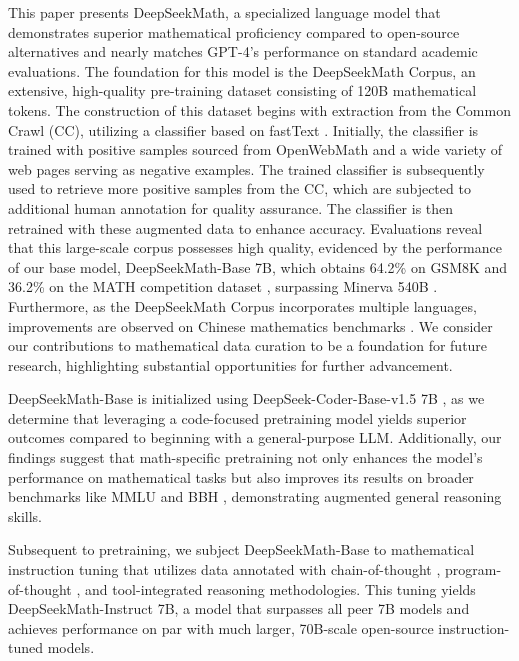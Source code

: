 This paper presents DeepSeekMath, a specialized language model that demonstrates superior mathematical proficiency compared to open-source alternatives and nearly matches GPT-4’s performance on standard academic evaluations. The foundation for this model is the DeepSeekMath Corpus, an extensive, high-quality pre-training dataset consisting of 120B mathematical tokens. The construction of this dataset begins with extraction from the Common Crawl (CC), utilizing a classifier based on fastText \citep{joulin2016fasttext}. Initially, the classifier is trained with positive samples sourced from OpenWebMath \citep{openwebmath} and a wide variety of web pages serving as negative examples. The trained classifier is subsequently used to retrieve more positive samples from the CC, which are subjected to additional human annotation for quality assurance. The classifier is then retrained with these augmented data to enhance accuracy. Evaluations reveal that this large-scale corpus possesses high quality, evidenced by the performance of our base model, DeepSeekMath-Base 7B, which obtains 64.2\% on GSM8K \citep{gsm8k} and 36.2\% on the MATH competition dataset \citep{MATH}, surpassing Minerva 540B \citep{minerva}. Furthermore, as the DeepSeekMath Corpus incorporates multiple languages, improvements are observed on Chinese mathematics benchmarks \citep{wei2023cmath,agieval}. We consider our contributions to mathematical data curation to be a foundation for future research, highlighting substantial opportunities for further advancement.

DeepSeekMath-Base is initialized using DeepSeek-Coder-Base-v1.5 7B \citep{deepseek-coder}, as we determine that leveraging a code-focused pretraining model yields superior outcomes compared to beginning with a general-purpose LLM. Additionally, our findings suggest that math-specific pretraining not only enhances the model’s performance on mathematical tasks but also improves its results on broader benchmarks like MMLU \citep{mmlu} and BBH \citep{bbh}, demonstrating augmented general reasoning skills.

Subsequent to pretraining, we subject DeepSeekMath-Base to mathematical instruction tuning that utilizes data annotated with chain-of-thought \citep{cot}, program-of-thought \citep{pot,pal}, and tool-integrated reasoning \citep{tora} methodologies. This tuning yields DeepSeekMath-Instruct 7B, a model that surpasses all peer 7B models and achieves performance on par with much larger, 70B-scale open-source instruction-tuned models.

